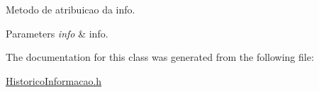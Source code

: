 Metodo de atribuicao da info. 
\begin{DoxyParams}{Parameters}
{\em info} & info. \\
\hline
\end{DoxyParams}


The documentation for this class was generated from the following file\-:\begin{DoxyCompactItemize}
\item 
\hyperlink{_historico_informacao_8h}{Historico\-Informacao.\-h}\end{DoxyCompactItemize}
